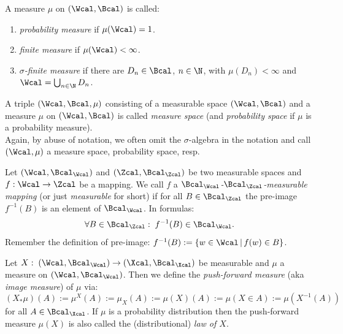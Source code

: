 \begin{Def}
    A measure $\mu$ on $(\Wcal,\Bcal)$ is called:
    \begin{enumerate}
        \item \emph{probability measure} if $\mu(\Wcal)=1$.
        \item \emph{finite measure} if $\mu(\Wcal) < \infty$.
        \item \emph{$\sigma$-finite measure} if there are $D_n \in \Bcal$, $n \in \N$, with $\mu(D_n) < \infty$ and $\Wcal = \bigcup_{n \in \N} D_n$.
    \end{enumerate}
\end{Def}

\begin{Def}
    A triple $(\Wcal, \Bcal, \mu)$ consisting of a measurable space $(\Wcal,\Bcal)$ and a measure $\mu$ on $(\Wcal,\Bcal)$ is called \emph{measure space}
    (and \emph{probability space} if $\mu$ is a probability measure).\\
    Again, by abuse of notation, we often omit the $\sigma$-algebra in the notation and call $(\Wcal,\mu)$ a measure space, probability space, resp.
\end{Def}

\begin{Def}
    Let $(\Wcal,\Bcal_\Wcal)$ and $(\Zcal,\Bcal_\Zcal)$ be two measurable spaces and $f: \Wcal \to \Zcal$ be a mapping.
    We call $f$ a \emph{$\Bcal_\Wcal$-$\Bcal_\Zcal$-measurable mapping} (or just \emph{measurable} for short) if
    for all $B \in \Bcal_\Zcal$ the pre-image $f^{-1}(B)$ is an element of $\Bcal_\Wcal$. In formulas:
    \[\forall B \in \Bcal_\Zcal:\; f^{-1}(B) \in \Bcal_\Wcal.\]
    Remember the definition of pre-image: $f^{-1}(B) := \{ w\in \Wcal\,|\, f(w) \in B \}$.
\end{Def}



\begin{Def}
    Let  $X:\; (\Wcal,\Bcal_\Wcal) \to (\Xcal,\Bcal_\Xcal)$ be measurable and $\mu$ a measure on $(\Wcal,\Bcal_\Wcal)$.
    Then we define the \emph{push-forward measure} (aka \emph{image measure}) of $\mu$ via:
    \[ (X_*\mu)(A):= \mu^X(A) := \mu_X(A) := \mu(X)(A):= \mu(X \in A):= \mu(X^{-1}(A))\]
    for all $A \in \Bcal_\Xcal$.
    If $\mu$ is a probability distribution then the push-forward measure $\mu(X)$ is also called the (distributional) \emph{law of $X$}.
\end{Def}


